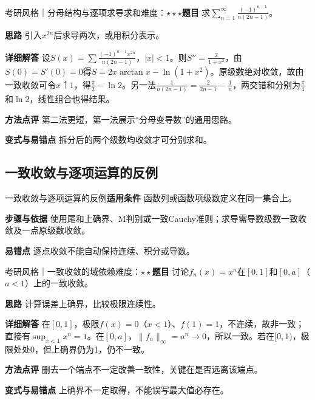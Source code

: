 \begin{example}{考研风格｜分母结构与逐项求导求和}{难度：$\star\star\star$}\label{deep:ex:series_source_deep:jdenominator}\textbf{题目} 求$\sum_{n=1}^\infty\frac{(-1)^{n-1}}{n(2n-1)}$。\par\textbf{思路} 引入$x^{2n}$后求导两次，或用积分表示。\par\textbf{详细解答} 设$S(x)=\sum\frac{(-1)^{n-1}x^{2n}}{n(2n-1)}$，$|x|<1$。则$S''=\frac{2}{1+x^2}$，由$S(0)=S'(0)=0$得$S=2x\arctan x-\ln(1+x^2)$。原级数绝对收敛，故由一致收敛可令$x\uparrow1$，得$\frac{\pi}{2}-\ln2$。另一法$\frac{1}{n(2n-1)}=\frac{2}{2n-1}-\frac{1}{n}$，两交错和分别为$\frac{\pi}{4}$和$\ln2$，线性组合也得结果。\par\textbf{方法点评} 第二法更短，第一法展示“分母变导数”的通用思路。\par\textbf{变式与易错点} 拆分后的两个级数均收敛才可分别求和。\end{example}

\subsection{一致收敛与逐项运算的反例}\label{deep:series_source_deep:uniform}

\begin{method}{一致收敛与逐项运算的反例}\textbf{适用条件} 函数列或函数项级数定义在同一集合上。\par\textbf{步骤与依据} 使用尾和上确界、M判别或一致Cauchy准则；求导需导数级数一致收敛及一点原级数收敛。\par\textbf{易错点} 逐点收敛不能自动保持连续、积分或导数。\end{method}

\begin{example}{考研风格｜一致收敛的域依赖}{难度：$\star\star$}\label{deep:ex:series_source_deep:uniform1}\textbf{题目} 讨论$f_n(x)=x^n$在$[0,1]$和$[0,a]$（$a<1$）上的一致收敛。\par\textbf{思路} 计算误差上确界，比较极限连续性。\par\textbf{详细解答} 在$[0,1]$，极限$f(x)=0$（$x<1$）、$f(1)=1$，不连续，故非一致；直接有$\sup_{x<1}x^n=1$。在$[0,a]$，$\|f_n\|_\infty=a^n\to0$，所以一致。若在$[0,1)$，极限处处0，但上确界仍为1，仍不一致。\par\textbf{方法点评} 删去一个端点不一定改善一致性，关键在是否远离该端点。\par\textbf{变式与易错点} 上确界不一定取得，不能误写最大值必存在。\end{example}

